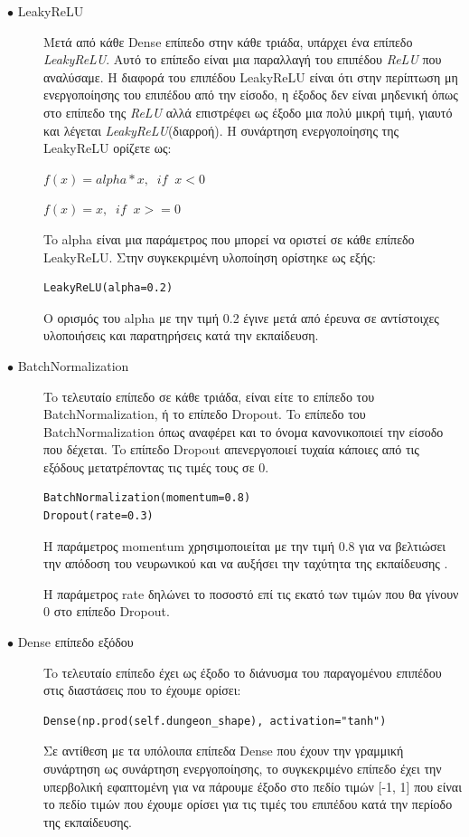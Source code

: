 \begin{description}
\item[$\bullet$ LeakyReLU] Μετά από κάθε Dense επίπεδο στην κάθε τριάδα, υπάρχει ένα επίπεδο \textit{LeakyReLU}. Αυτό το επίπεδο είναι μια παραλλαγή του επιπέδου \textit{ReLU} που αναλύσαμε. Η διαφορά  του επιπέδου LeakyReLU είναι ότι στην περίπτωση μη ενεργοποίησης του επιπέδου από την είσοδο, η έξοδος δεν είναι μηδενική όπως στο επίπεδο της \textit{ReLU} αλλά επιστρέφει ως έξοδο μια πολύ μικρή τιμή, γιαυτό και λέγεται \textit{LeakyReLU}(διαρροή). Η συνάρτηση ενεργοποίησης της LeakyReLU ορίζετε ως:
\par
$f(x) = alpha * x,  \;\; if \;\; x < 0$
\par
$f(x) = x,  \;\; if \;\; x >= 0$
\par
To alpha είναι μια παράμετρος που μπορεί να οριστεί σε κάθε επίπεδο LeakyReLU. Στην συγκεκριμένη υλοποίηση ορίστηκε ως εξής:
\begin{verbatim}
LeakyReLU(alpha=0.2)
\end{verbatim}
\par
O ορισμός του alpha με την τιμή 0.2 έγινε μετά από έρευνα σε αντίστοιχες υλοποιήσεις και παρατηρήσεις κατά την εκπαίδευση. \cite{firstgan} \cite{firstgan2} \cite{firstgan3} 
\end{description}

\begin{description}
\item[$\bullet$ BatchNormalization] To τελευταίο επίπεδο σε κάθε τριάδα, είναι είτε το επίπεδο του BatchNormalization, ή το επίπεδο Dropout. To επίπεδο του BatchNormalization όπως αναφέρει και το όνομα κανονικοποιεί την είσοδο που δέχεται. To επίπεδο Dropout απενεργοποιεί τυχαία κάποιες από τις εξόδους μετατρέποντας τις τιμές τους σε 0.
\par
\begin{verbatim}
BatchNormalization(momentum=0.8)
Dropout(rate=0.3)
\end{verbatim}
\par
Η παράμετρος momentum χρησιμοποιείται με την τιμή 0.8 για να βελτιώσει την απόδοση του νευρωνικού και να αυξήσει την ταχύτητα της εκπαίδευσης \cite{firstgan}. 
\par
H παράμετρος rate δηλώνει το ποσοστό επί τις εκατό των τιμών που θα γίνουν 0 στο επίπεδο Dropout.
\end{description}

\begin{description}
\item[$\bullet$ Dense επίπεδο εξόδου] To τελευταίο επίπεδο έχει ως έξοδο το διάνυσμα του παραγομένου επιπέδου στις διαστάσεις που το έχουμε ορίσει:
\par
\begin{verbatim}
Dense(np.prod(self.dungeon_shape), activation="tanh")
\end{verbatim}
\par
Σε αντίθεση με τα υπόλοιπα επίπεδα Dense που έχουν την γραμμική συνάρτηση ως συνάρτηση ενεργοποίησης, το συγκεκριμένο επίπεδο έχει την υπερβολική εφαπτομένη για να πάρουμε έξοδο στο πεδίο τιμών [-1, 1] που είναι το πεδίο τιμών που έχουμε ορίσει για τις τιμές του επιπέδου κατά την περίοδο της εκπαίδευσης.
\end{description}

